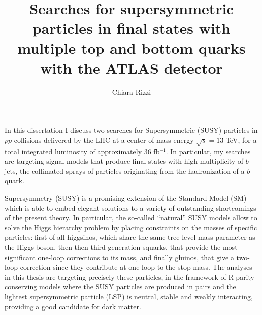 \documentclass[11pt,a4paper]{article}
\title{Searches for supersymmetric particles in final states with multiple top and bottom quarks with the ATLAS detector}
\author{Chiara Rizzi}
\date{}
\newcommand{\cmtre}{\ensuremath{\sqrt{s}  =  13}\xspace}
\def\ifb{\mbox{fb$^{-1}$}} %
\begin{document}
\maketitle


In this dissertation I discuss two searches for Supersymmetric (SUSY) particles in $pp$ collisions delivered by the LHC at a center-of-mass energy \cmtre TeV, for a total integrated luminosity of approximately 36 \ifb. In particular, my searches are targeting signal models that produce final states with high multiplicity of $b$-jets, the collimated sprays of particles originating from the hadronization of a $b$-quark. 

Supersymmetry (SUSY) is a promising extension of the Standard Model (SM) which is able to embed elegant solutions to a variety of outstanding shortcomings of the present theory. In particular, the so-called ``natural'' SUSY models allow to solve the Higgs hierarchy problem by placing constraints on the masses of specific particles: first of all higgsinos, which share the same tree-level mass parameter as the Higgs boson, then 
then third generation squarks, that provide the most significant one-loop corrections to its mass, and finally gluinos, that give a two-loop correction since they contribute at one-loop to the stop mass. 
The analyses in this thesis are targeting precisely these particles, in the framework of R-parity conserving models where the SUSY particles are produced in pairs and the lightest supersymmetric particle (LSP) is neutral, stable and weakly interacting, providing a good candidate for dark matter.
 
\end{document}
